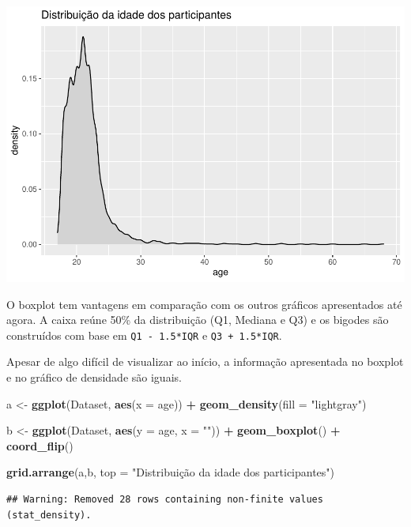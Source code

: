 \documentclass[
]{book}
\newenvironment{Shaded}{\begin{snugshade}}{\end{snugshade}}
\newcommand{\DataTypeTok}[1]{\textcolor[rgb]{0.13,0.29,0.53}{#1}}
\newcommand{\KeywordTok}[1]{\textcolor[rgb]{0.13,0.29,0.53}{\textbf{#1}}}
\newcommand{\NormalTok}[1]{#1}
\newcommand{\OperatorTok}[1]{\textcolor[rgb]{0.81,0.36,0.00}{\textbf{#1}}}
\newcommand{\StringTok}[1]{\textcolor[rgb]{0.31,0.60,0.02}{#1}}
\begin{document}
\includegraphics{gitbook-demo_files/figure-latex/unnamed-chunk-17-1.pdf}

O boxplot tem vantagens em comparação com os outros gráficos apresentados até agora. A caixa reúne 50\% da distribuição (Q1, Mediana e Q3) e os bigodes são construídos com base em \texttt{Q1\ -\ 1.5*IQR} e \texttt{Q3\ +\ 1.5*IQR}.

Apesar de algo difícil de visualizar ao início, a informação apresentada no boxplot e no gráfico de densidade são iguais.

\begin{Shaded}
\begin{Highlighting}[]
\NormalTok{a <-}\StringTok{ }\KeywordTok{ggplot}\NormalTok{(Dataset, }\KeywordTok{aes}\NormalTok{(}\DataTypeTok{x =}\NormalTok{ age)) }\OperatorTok{+}
\StringTok{  }\KeywordTok{geom_density}\NormalTok{(}\DataTypeTok{fill =} \StringTok{"lightgray"}\NormalTok{)}

\NormalTok{b <-}\StringTok{ }\KeywordTok{ggplot}\NormalTok{(Dataset, }\KeywordTok{aes}\NormalTok{(}\DataTypeTok{y =}\NormalTok{ age, }\DataTypeTok{x =} \StringTok{""}\NormalTok{)) }\OperatorTok{+}
\StringTok{  }\KeywordTok{geom_boxplot}\NormalTok{() }\OperatorTok{+}
\StringTok{  }\KeywordTok{coord_flip}\NormalTok{()}

\KeywordTok{grid.arrange}\NormalTok{(a,b, }\DataTypeTok{top =} \StringTok{"Distribuição da idade dos participantes"}\NormalTok{)}
\end{Highlighting}
\end{Shaded}

\begin{verbatim}
## Warning: Removed 28 rows containing non-finite values (stat_density).
\end{verbatim}
\end{document}
